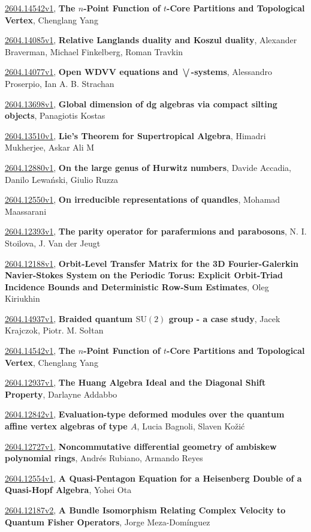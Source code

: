 \documentclass[9pt, a4paper]{article}
\theoremstyle{plain}
\theoremstyle{definition}
\theoremstyle{remark}
\newcommand{\arxiv}[3]{\href{https://arxiv.org/abs/#1}{#1}, \textbf{\textcolor{arxivblue}{#2}}, #3}
\begin{document}
\arxiv{2604.14542v1}{The $n$-Point Function of $t$-Core Partitions and Topological Vertex}{Chenglang Yang}

\arxiv{2604.14085v1}{Relative Langlands duality and Koszul duality}{Alexander Braverman, Michael Finkelberg, Roman Travkin}

\arxiv{2604.14077v1}{Open WDVV equations and $\bigvee$-systems}{Alessandro Proserpio, Ian A. B. Strachan}

\arxiv{2604.13698v1}{Global dimension of dg algebras via compact silting objects}{Panagiotis Kostas}

\arxiv{2604.13510v1}{Lie's Theorem for Supertropical Algebra}{Himadri Mukherjee, Askar Ali M}

\arxiv{2604.12880v1}{On the large genus of Hurwitz numbers}{Davide Accadia, Danilo Lewański, Giulio Ruzza}

\arxiv{2604.12550v1}{On irreducible representations of quandles}{Mohamad Maassarani}

\arxiv{2604.12393v1}{The parity operator for parafermions and parabosons}{N. I. Stoilova, J. Van der Jeugt}

\arxiv{2604.12188v1}{Orbit-Level Transfer Matrix for the 3D Fourier-Galerkin Navier-Stokes System on the Periodic Torus: Explicit Orbit-Triad Incidence Bounds and Deterministic Row-Sum Estimates}{Oleg Kiriukhin}

\arxiv{2604.14937v1}{Braided quantum $\mathrm{SU}(2)$ group - a case study}{Jacek Krajczok, Piotr. M. Sołtan}

\arxiv{2604.14542v1}{The $n$-Point Function of $t$-Core Partitions and Topological Vertex}{Chenglang Yang}

\arxiv{2604.12937v1}{The Huang Algebra Ideal and the Diagonal Shift Property}{Darlayne Addabbo}

\arxiv{2604.12842v1}{Evaluation-type deformed modules over the quantum affine vertex algebras of type $A$}{Lucia Bagnoli, Slaven Kožić}

\arxiv{2604.12727v1}{Noncommutative differential geometry of ambiskew polynomial rings}{Andrés Rubiano, Armando Reyes}

\arxiv{2604.12554v1}{A Quasi-Pentagon Equation for a Heisenberg Double of a Quasi-Hopf Algebra}{Yohei Ota}

\arxiv{2604.12187v2}{A Bundle Isomorphism Relating Complex Velocity to Quantum Fisher Operators}{Jorge Meza-Domínguez}

\end{document}
